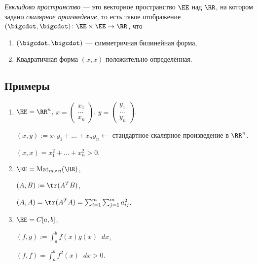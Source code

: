 \begin{definition}
    \textit{Евклидово пространство} --- это векторное пространство $\EE$ над $\RR$, на котором задано \textit{скалярное произведение}, то есть такое отображение $(\bigcdot, \bigcdot)\colon \EE \times \EE \to \RR$, что
    \begin{enumerate}[nosep]
        \item $(\bigcdot, \bigcdot)$ --- симметричная билинейная форма,
        \item Квадратичная форма $(x, x)$ положительно определённая.
    \end{enumerate}
\end{definition}


\subsection{Примеры}

\begin{enumerate}
\item 
    $\EE = \RR^n$, $x = \begin{pmatrix} x_1 \\ \dots \\ x_n \end{pmatrix}$, $y = \begin{pmatrix} y_1 \\ \dots \\ y_n \end{pmatrix}$.

    $(x, y) := x_1 y_1 + \dots + x_n y_n \leftarrow $ стандартное скалярное произведение в $\RR^n$.

    $(x, x) = x_1^2 + \dots + x_n^2 > 0$.

\item
    $\EE = \text{Mat}_{m \times n}(\RR)$,

    $(A, B) := \tr (A^{T} B)$,

    $(A, A) = \tr (A^{T}A) = \sum_{i = 1}^{m} \sum_{j = 1}^{m} a_{ij}^2$.

\item
    $\EE = C[a, b]$,
    
    $(f, g) := \int_a^b f(x) g(x) \mathop{}\!dx$,

    $(f, f) = \int_a^b f^2(x) \mathop{}\!dx > 0$.
\end{enumerate}
